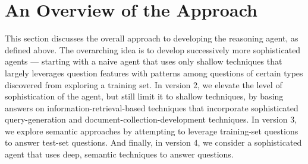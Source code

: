 %

\section{An Overview of the Approach}

This section discusses the overall approach to developing the reasoning agent, as defined above.
The overarching idea is to develop successively more sophisticated agents --- starting with a naive
agent that uses only shallow techniques that largely leverages question features with patterns 
among questions of certain types discovered from exploring a training set.  In version 2, we elevate the 
level of sophistication of the agent, but still limit it  to shallow techniques, by basing  answers on 
information-retrieval-based techniques that incorporate sophisticated query-generation and 
document-collection-development techniques.  In version 3, we explore semantic approaches by attempting
to leverage training-set questions to answer test-set questions.  And finally, in version 4, we consider
a sophisticated agent that uses deep, semantic techniques to answer questions.



